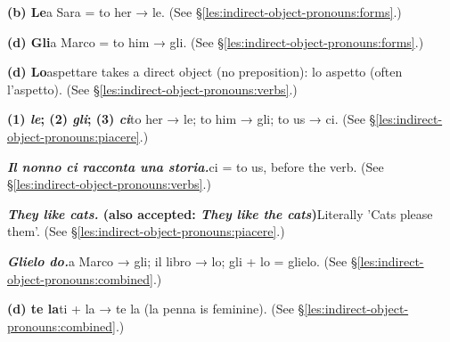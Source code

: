 \documentclass[11pt,a4paper,twoside,openright]{book}
\newcommand{\answerheading}[1]{\par\medskip\noindent{\sffamily\bfseries\small #1}\par\nopagebreak}
\begin{document}
\answerheading{\S\ref{les:indirect-object-pronouns} Indirect object pronouns}\label{ans:indirect-object-pronouns}
\begin{answers}
\item\relax \textbf{(b) Le}\newline a Sara = to her → le. {\color{muted}(See \S\ref{les:indirect-object-pronouns:forms}.)}
\item\relax \textbf{(d) Gli}\newline a Marco = to him → gli. {\color{muted}(See \S\ref{les:indirect-object-pronouns:forms}.)}
\item\relax \textbf{(d) Lo}\newline aspettare takes a direct object (no preposition): lo aspetto (often l'aspetto). {\color{muted}(See \S\ref{les:indirect-object-pronouns:verbs}.)}
\item\relax \textbf{(1) \textit{le}; (2) \textit{gli}; (3) \textit{ci}}\newline to her → le; to him → gli; to us → ci. {\color{muted}(See \S\ref{les:indirect-object-pronouns:piacere}.)}
\item\relax \textbf{\textit{Il nonno ci racconta una storia.}}\newline ci = to us, before the verb. {\color{muted}(See \S\ref{les:indirect-object-pronouns:verbs}.)}
\item\relax \textbf{\textit{They like cats.} {\color{muted}(also accepted: \textit{They like the cats})}}\newline Literally 'Cats please them'. {\color{muted}(See \S\ref{les:indirect-object-pronouns:piacere}.)}
\item\relax \textbf{\textit{Glielo do.}}\newline a Marco → gli; il libro → lo; gli + lo = glielo. {\color{muted}(See \S\ref{les:indirect-object-pronouns:combined}.)}
\item\relax \textbf{(d) te la}\newline ti + la → te la (la penna is feminine). {\color{muted}(See \S\ref{les:indirect-object-pronouns:combined}.)}
\end{answers}
\end{document}
